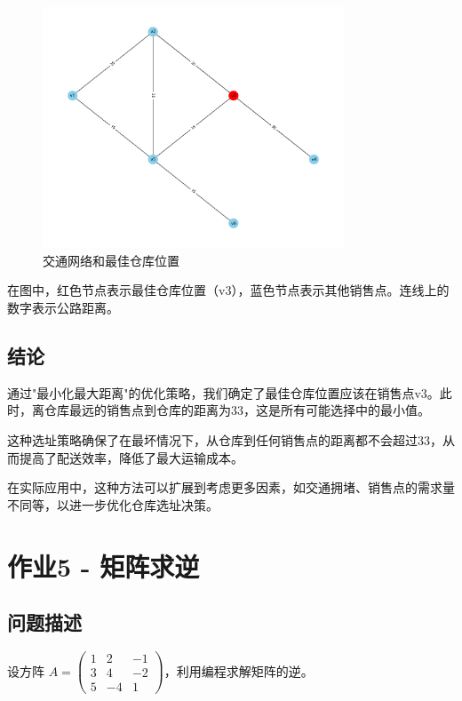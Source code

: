 \documentclass[bwprint]{cumcmthesis}
\begin{document}
\begin{figure}[htbp]
    \centering
    \includegraphics[width=0.8\textwidth]{figures/4.png}
    \caption{交通网络和最佳仓库位置}
    \label{fig:warehouse}
\end{figure}

在图中，红色节点表示最佳仓库位置（v3），蓝色节点表示其他销售点。连线上的数字表示公路距离。

\subsection{结论}
通过"最小化最大距离"的优化策略，我们确定了最佳仓库位置应该在销售点v3。此时，离仓库最远的销售点到仓库的距离为33，这是所有可能选择中的最小值。

这种选址策略确保了在最坏情况下，从仓库到任何销售点的距离都不会超过33，从而提高了配送效率，降低了最大运输成本。

在实际应用中，这种方法可以扩展到考虑更多因素，如交通拥堵、销售点的需求量不同等，以进一步优化仓库选址决策。

\section{作业5 - 矩阵求逆}

\subsection{问题描述}
设方阵 $A = \begin{pmatrix} 1 & 2 & -1 \\ 3 & 4 & -2 \\ 5 & -4 & 1 \end{pmatrix}$，利用编程求解矩阵的逆。
\end{document}
